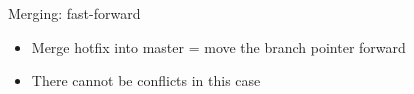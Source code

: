 \documentclass{beamer}
\begin{document}
\begin{frame}{Merging: fast-forward}
  \begin{center}
  \end{center}
  \begin{itemize}
  \item Merge hotfix into master = move the branch pointer forward
  \item There cannot be conflicts in this case
  \end{itemize}
\end{frame}
\end{document}

